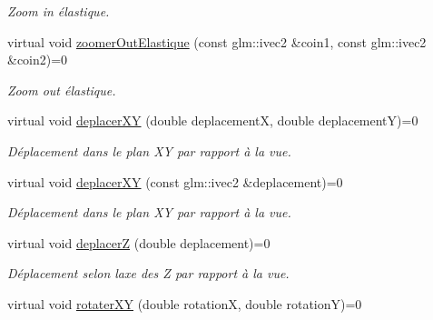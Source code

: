 \begin{DoxyCompactItemize}
\begin{DoxyCompactList}\small\item\em Zoom in élastique. \end{DoxyCompactList}\item 
\hypertarget{classvue_1_1_vue_a7f2121399c50dbec8db7a8d8fab78ddc}{}virtual void \hyperlink{classvue_1_1_vue_a7f2121399c50dbec8db7a8d8fab78ddc}{zoomer\+Out\+Elastique} (const glm\+::ivec2 \&coin1, const glm\+::ivec2 \&coin2)=0\label{classvue_1_1_vue_a7f2121399c50dbec8db7a8d8fab78ddc}

\begin{DoxyCompactList}\small\item\em Zoom out élastique. \end{DoxyCompactList}\item 
\hypertarget{classvue_1_1_vue_a8e4dec26a65250ec721b044333bf62ce}{}virtual void \hyperlink{classvue_1_1_vue_a8e4dec26a65250ec721b044333bf62ce}{deplacer\+X\+Y} (double deplacement\+X, double deplacement\+Y)=0\label{classvue_1_1_vue_a8e4dec26a65250ec721b044333bf62ce}

\begin{DoxyCompactList}\small\item\em Déplacement dans le plan X\+Y par rapport à la vue. \end{DoxyCompactList}\item 
\hypertarget{classvue_1_1_vue_a4019b90a0a76ca3eb3633dda3bcb397a}{}virtual void \hyperlink{classvue_1_1_vue_a4019b90a0a76ca3eb3633dda3bcb397a}{deplacer\+X\+Y} (const glm\+::ivec2 \&deplacement)=0\label{classvue_1_1_vue_a4019b90a0a76ca3eb3633dda3bcb397a}

\begin{DoxyCompactList}\small\item\em Déplacement dans le plan X\+Y par rapport à la vue. \end{DoxyCompactList}\item 
\hypertarget{classvue_1_1_vue_aa54f93fe75f0df62893e7f92f1466a33}{}virtual void \hyperlink{classvue_1_1_vue_aa54f93fe75f0df62893e7f92f1466a33}{deplacer\+Z} (double deplacement)=0\label{classvue_1_1_vue_aa54f93fe75f0df62893e7f92f1466a33}

\begin{DoxyCompactList}\small\item\em Déplacement selon l\textquotesingle{}axe des Z par rapport à la vue. \end{DoxyCompactList}\item 
\hypertarget{classvue_1_1_vue_a07067586589d8a391a18c3e1a4e9482e}{}virtual void \hyperlink{classvue_1_1_vue_a07067586589d8a391a18c3e1a4e9482e}{rotater\+X\+Y} (double rotation\+X, double rotation\+Y)=0\label{classvue_1_1_vue_a07067586589d8a391a18c3e1a4e9482e}


\end{DoxyCompactItemize}

